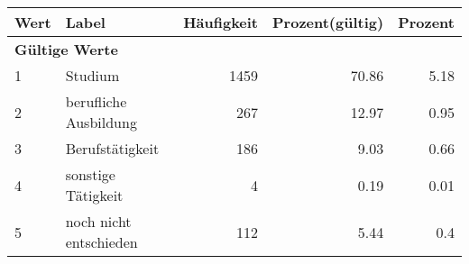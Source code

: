      \begin{longtable}{lXrrr}
     \toprule
     \textbf{Wert} & \textbf{Label} & \textbf{Häufigkeit} & \textbf{Prozent(gültig)} & \textbf{Prozent} \\
     \endhead
     \midrule
     \multicolumn{5}{l}{\textbf{Gültige Werte}}\\

     1 &
     \multicolumn{1}{X}{ Studium   } &


       \num{1459} &
       \num[round-mode=places,round-precision=2]{70.86} &
         \num[round-mode=places,round-precision=2]{5.18} \\

     2 &
     \multicolumn{1}{X}{ berufliche Ausbildung   } &


       \num{267} &
       \num[round-mode=places,round-precision=2]{12.97} &
         \num[round-mode=places,round-precision=2]{0.95} \\

     3 &
     \multicolumn{1}{X}{ Berufstätigkeit   } &


       \num{186} &
       \num[round-mode=places,round-precision=2]{9.03} &
         \num[round-mode=places,round-precision=2]{0.66} \\

     4 &
     \multicolumn{1}{X}{ sonstige Tätigkeit   } &


       \num{4} &
       \num[round-mode=places,round-precision=2]{0.19} &
         \num[round-mode=places,round-precision=2]{0.01} \\

     5 &
     \multicolumn{1}{X}{ noch nicht entschieden   } &


       \num{112} &
       \num[round-mode=places,round-precision=2]{5.44} &
         \num[round-mode=places,round-precision=2]{0.4} \\


\end{longtable}
